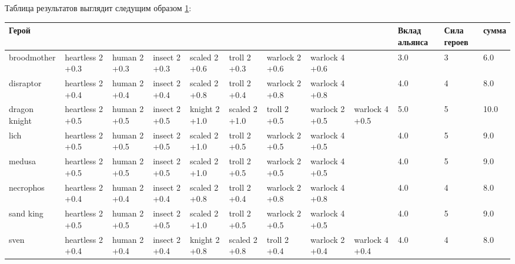 \documentclass{article}
\begin{document}

Таблица результатов выглядит следущим образом \ref{solution}:
\begin{table}
\resizebox{17cm}{!} {
\begin{tabular}{l| *{8}{p{1.6cm}} | *{3}{ p{1cm}} }
\label{solution}
{Герой} &                   &               &                &                &                &                  &                  &                  &  Вклад альянса &  Сила героев &   сумма \\
\midrule
broodmother   &  heartless 2 +0.3  &  human 2 +0.3  &  insect 2 +0.3  &  scaled 2 +0.6  &   troll 2 +0.3  &  warlock  2 +0.6  &  warlock  4 +0.6  &                   &                  3.0 &           3 &   6.0 \\
disraptor     &  heartless 2 +0.4  &  human 2 +0.4  &  insect 2 +0.4  &  scaled 2 +0.8  &   troll 2 +0.4  &  warlock  2 +0.8  &  warlock  4 +0.8  &                   &                  4.0 &           4 &   8.0 \\
dragon knight &  heartless 2 +0.5  &  human 2 +0.5  &  insect 2 +0.5  &  knight 2 +1.0  &  scaled 2 +1.0  &     troll 2 +0.5  &  warlock  2 +0.5  &  warlock  4 +0.5  &                  5.0 &           5 &  10.0 \\
lich          &  heartless 2 +0.5  &  human 2 +0.5  &  insect 2 +0.5  &  scaled 2 +1.0  &   troll 2 +0.5  &  warlock  2 +0.5  &  warlock  4 +0.5  &                   &                  4.0 &           5 &   9.0 \\
medusa        &  heartless 2 +0.5  &  human 2 +0.5  &  insect 2 +0.5  &  scaled 2 +1.0  &   troll 2 +0.5  &  warlock  2 +0.5  &  warlock  4 +0.5  &                   &                  4.0 &           5 &   9.0 \\
necrophos     &  heartless 2 +0.4  &  human 2 +0.4  &  insect 2 +0.4  &  scaled 2 +0.8  &   troll 2 +0.4  &  warlock  2 +0.8  &  warlock  4 +0.8  &                   &                  4.0 &           4 &   8.0 \\
sand king     &  heartless 2 +0.5  &  human 2 +0.5  &  insect 2 +0.5  &  scaled 2 +1.0  &   troll 2 +0.5  &  warlock  2 +0.5  &  warlock  4 +0.5  &                   &                  4.0 &           5 &   9.0 \\
sven          &  heartless 2 +0.4  &  human 2 +0.4  &  insect 2 +0.4  &  knight 2 +0.8  &  scaled 2 +0.8  &     troll 2 +0.4  &  warlock  2 +0.4  &  warlock  4 +0.4  &                  4.0 &           4 &   8.0 \\

\end{tabular}}
\end{table}
\end{document}
